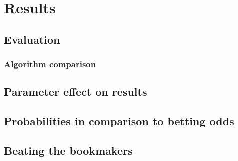 \documentclass[conference]{IEEEtran}
\begin{document}

\section{Results}
\subsection{Evaluation}
\subsubsection{Algorithm comparison}
\subsection{Parameter effect on results}
\subsection{Probabilities in comparison to betting odds}
\subsection{Beating the bookmakers}

%
%

\end{document}
